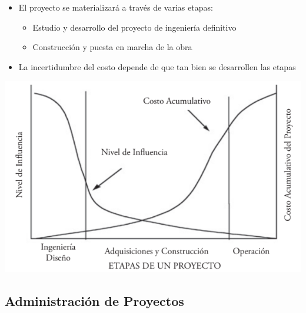 \documentclass{article} %
\begin{document}
\begin{minipage}{0.45\textwidth}
    \begin{itemize}[label={},left=0pt,align=parleft]
        \item \begin{highlightbox}[levelone] El proyecto se materializará a través de varias etapas: \end{highlightbox}
        \begin{itemize}[label={},left=1em,align=parleft]
            \item \begin{highlightbox}[leveltwo] Estudio y desarrollo del proyecto de ingeniería definitivo \end{highlightbox}
            \item \begin{highlightbox}[leveltwo] Construcción y puesta en marcha de la obra \end{highlightbox}
        \end{itemize}
        \item \begin{highlightbox}[levelone] La incertidumbre del costo depende de que tan bien se desarrollen las etapas \end{highlightbox}
    \end{itemize}
\end{minipage}
\hfill
\begin{minipage}{0.5\textwidth}
    \centering
    \includegraphics[width=1.2\textwidth]{etapas_proyecto.png}
\end{minipage}

\subsection{Administración de Proyectos}
\end{document}
